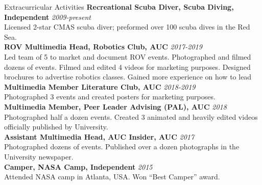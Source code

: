\documentclass{resume}
\begin{document}
\begin{small}
	\begin{rSection} {Extracurricular Activities}
		{\bf Recreational Scuba Diver, Scuba Diving, Independent} \hfill {\em 2009-present}\\
		Licensed 2-star CMAS scuba diver; preformed over 100 scuba dives in the Red Sea.\\
		{\bf ROV Multimedia Head, Robotics Club, AUC} \hfill {\em 2017-2019} \\
		Led team of 5 to market and document ROV events. Photographed and filmed dozens of events. Filmed and edited 4 videos for marketing purposes. Designed brochures to advertise robotics classes. Gained more experience on how to lead\\
		{\bf Multimedia Member Literature Club, AUC} \hfill {\em 2018-2019} \\
		Photographed 3 events and created posters for marketing purposes.\\
		{\bf Multimedia Member, Peer Leader Advising (PAL), AUC} \hfill {\em 2018}\\
		Photographed half a dozen events. Created 3 animated and heavily edited videos officially published by University.\\
		{\bf Assistant Multimedia Head, AUC Insider, AUC} \hfill {\em 2017}\\
		Photographed dozens of events. Published over a dozen photographs in the University newspaper.\\
		{\bf Camper, NASA Camp, Independent} \hfill {\em 2015}\\
		Attended NASA camp in Atlanta, USA. Won “Best Camper” award.\\
	\end{rSection}


\end{small}
\end{document}
